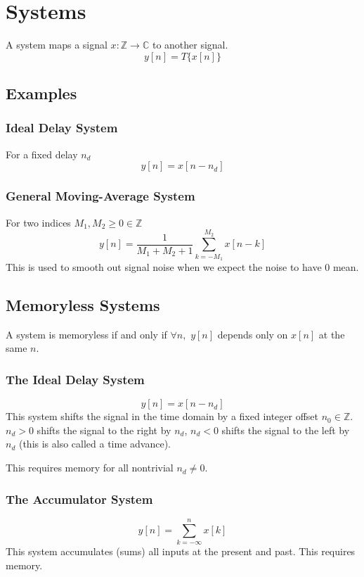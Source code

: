 \documentclass{article}
\begin{document}
\section{Systems}
A system maps a signal $x:\mathbb{Z}\to\mathbb{C}$ to another signal.
\[y[n] = T\{x[n]\}\]
\subsection{Examples}
\subsubsection{Ideal Delay System}
For a fixed delay $n_d$
\[y[n] = x[n-n_d]\]
\subsubsection{General Moving-Average System}
For two indices $M_1,M_2\ge0\in\mathbb{Z}$
\begin{equation}
    y[n] = \frac{1}{M_1+M_2+1}\sum_{k=-M_1}^{M_2}x[n-k]
\end{equation}
This is used to smooth out signal noise when we expect  the noise to have 0 mean.

\subsection{Memoryless Systems}
A system is memoryless if and only if $\forall n,$ $y[n]$ depends only on $x[n]$ at the same $n$.
\subsubsection{The Ideal Delay System}
\begin{equation}
    y[n] = x[n-n_d]
\end{equation}
This system shifts the signal in the time domain by a fixed integer offset $n_0\in\mathbb{Z}$. $n_d>0$ shifts the signal to the right by $n_d$, $n_d<0$ shifts the signal to the left by $n_d$ (this is also called a time advance).

This requires memory for all nontrivial $n_d\ne0$.
\subsubsection{The Accumulator System}
\begin{equation}
    y[n]=\sum_{k=-\infty}^n x[k]
\end{equation}
This system accumulates (sums) all inputs at the present and past. This requires memory.
\end{document}
